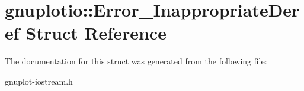 \hypertarget{structgnuplotio_1_1Error__InappropriateDeref}{}\section{gnuplotio\+:\+:Error\+\_\+\+Inappropriate\+Deref Struct Reference}
\label{structgnuplotio_1_1Error__InappropriateDeref}


The documentation for this struct was generated from the following file\+:\begin{DoxyCompactItemize}
\item 
gnuplot-\/iostream.\+h\end{DoxyCompactItemize}
